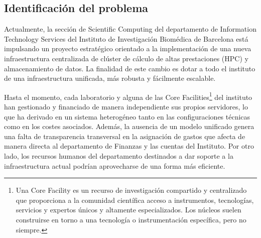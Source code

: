 \subsection{Identificación del problema}
Actualmente, la sección de Scientific Computing del departamento de Information Technology Services 
del Instituto de Investigación Biomédica de Barcelona está impulsando un proyecto estratégico orientado 
a la implementación de una nueva infraestructura centralizada de clúster de cálculo de altas prestaciones 
(HPC) y almacenamiento de datos. La finalidad de este cambio es dotar a todo el instituto de una 
infraestructura unificada, más robusta y fácilmente escalable.

Hasta el momento, cada laboratorio y alguna de las Core Facilities\footnote{Una Core Facility es un recurso 
de investigación compartido y centralizado que proporciona a la comunidad científica acceso a instrumentos, 
tecnologías, servicios y expertos únicos y altamente especializados. Los núcleos suelen construirse en torno 
a una tecnología o instrumentación específica, pero no siempre.\cite{CoreFacility2025}} del instituto han gestionado y 
financiado de manera independiente sus propios servidores, lo que ha derivado en un sistema heterogéneo 
tanto en las configuraciones técnicas como en los costes asociados. Además, la ausencia de un modelo unificado 
genera una falta de transparencia transversal en la asignación de gastos que afecta de manera directa al departamento 
de Finanzas y las cuentas del Instituto. Por otro lado, los recursos humanos del departamento destinados 
a dar soporte a la infraestructura actual podrían aprovecharse de una forma más eficiente.